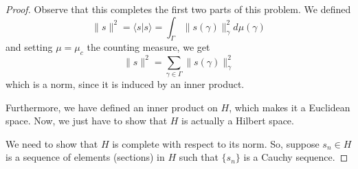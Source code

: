 \documentclass[fontsize=11pt]{scrartcl} %
\numberwithin{equation}{section} %
\numberwithin{figure}{section} %
\numberwithin{table}{section} %
\newcommand{\la}{\langle}
\newcommand{\ra}{\rangle}
\begin{document}
\begin{proof}
    Observe that this completes the first two parts of this problem. We defined
    \[
        \|s\|^2 = \la s|s\ra = \int_{\Gamma}\|s(\gamma)\|_{\gamma}^2
        d\mu(\gamma)
    \]
    and setting $\mu = \mu_c$ the counting measure, we get
    \[
        \|s\|^2 = \sum_{\gamma\in\Gamma}\|s(\gamma)\|_{\gamma}^2
    \]
    which is a norm, since it is induced by an inner product.

    Furthermore, we have defined an inner product on $H$, which makes it a
    Euclidean space. Now, we just have to show that $H$ is actually a Hilbert
    space.


    We need to show that $H$ is complete with respect to its norm. So, suppose
    $s_n\in H$ is a sequence of elements (sections) in $H$ such that $\{s_n\}$
    is a Cauchy sequence.

\end{proof}
\end{document}
